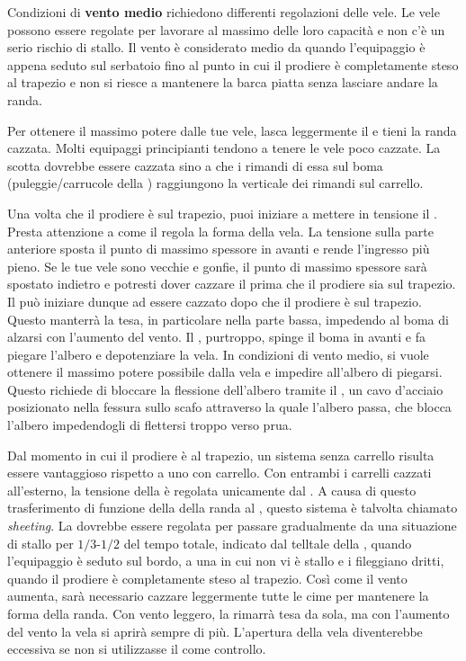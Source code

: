 Condizioni di \textbf{vento medio} richiedono differenti regolazioni delle vele.
Le vele possono essere regolate per lavorare al massimo delle loro capacità e
non c'è un serio rischio di stallo. Il vento è considerato medio da quando
l'equipaggio è appena seduto sul serbatoio \windward fino al punto in cui il
prodiere è completamente steso al trapezio e non si riesce a mantenere la
barca piatta senza lasciare andare la randa.

Per ottenere il massimo potere dalle tue vele, lasca leggermente il \outhaul e
tieni la randa cazzata. Molti equipaggi principianti tendono a tenere le
vele poco cazzate. La scotta dovrebbe essere cazzata sino a che i rimandi di
essa sul boma (puleggie/carrucole della \sheet) raggiungono la verticale dei
rimandi sul carrello.

Una volta che il prodiere è sul trapezio, puoi iniziare a mettere in tensione il
\cunningham. Presta attenzione a come il \cunningham regola la forma della vela.
La tensione sulla parte anteriore sposta il punto di massimo spessore in avanti
e rende l'ingresso più pieno. Se le tue vele sono vecchie e gonfie, il punto di
massimo spessore sarà spostato indietro e potresti dover cazzare il \cunningham
prima che il prodiere sia sul trapezio. Il \vang può iniziare dunque ad essere
cazzato dopo che il prodiere è sul trapezio. Questo manterrà la \leech tesa,
in particolare nella parte bassa, impedendo al boma di alzarsi con l'aumento del
vento. Il \vang, purtroppo, spinge il boma in avanti e fa piegare l'albero e
depotenziare la vela. In condizioni di vento medio, si vuole ottenere il massimo
potere possibile dalla vela e impedire all'albero di piegarsi. Questo richiede
di bloccare la flessione dell'albero tramite il \mastpull, un cavo d'acciaio
posizionato nella fessura sullo scafo attraverso la quale l'albero passa,
che blocca l'albero impedendogli di flettersi troppo verso prua.

Dal momento in cui il prodiere è al trapezio, un sistema senza carrello risulta
essere vantaggioso rispetto a uno con carrello. Con entrambi i carrelli cazzati
all'esterno, la tensione della \leech è regolata unicamente dal \vang. A causa
di questo trasferimento di funzione della \sheet della randa al \vang, questo
sistema è talvolta chiamato \emph{\vang sheeting}. La \leech dovrebbe essere
regolata per passare gradualmente da una situazione di stallo per $1/3$-$1/2$
del tempo totale, indicato dal telltale della \leech, quando l'equipaggio è
seduto sul bordo, a una in cui non vi è stallo e i \telltales fileggiano dritti,
quando il prodiere è completamente steso al trapezio. Così come il vento
aumenta, sarà necessario cazzare leggermente tutte le cime per mantenere la
forma della randa. Con vento leggero, la \leech rimarrà tesa da sola, ma con
l'aumento del vento la vela si aprirà sempre di più. L'apertura della vela
diventerebbe eccessiva se non si utilizzasse il \vang come controllo.

